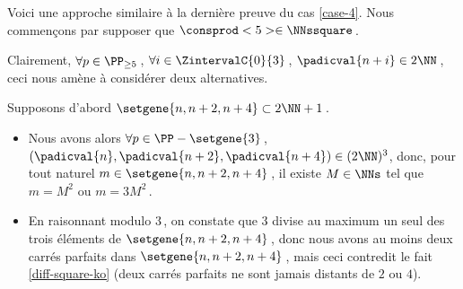 Voici une approche similaire à la dernière preuve du cas \ref{case-4}.
Nous commençons par supposer que $\consprod<5> \in \NNssquare$\,.
    
\smallskip

Clairement, $\forall p \in \PP_{\geq 5}$\,, 
$\forall i \in \ZintervalC{0}{3}$\,, 
$\padicval{n + i} \in 2 \NN$\,,
ceci nous amène à considérer deux alternatives.

\medskip

Supposons d'abord $\setgene{n, n + 2, n + 4} \subset 2 \NN + 1$\,.
%	
\begin{itemize}
	\item
	Nous avons alors
	$\forall p \in \PP - \setgene{3}$\,, 
	$(\padicval{n}, \padicval{n+2}, \padicval{n+4}) \in ( 2 \NN )^3$,
	donc, pour tout naturel $m \in \setgene{n, n + 2, n + 4}$\,, 
	il existe $M \in \NNs$ tel que 
	$m = M^2$ ou $m = 3 M^2$\,.
	
	\item En raisonnant modulo $3$\,, on constate que $3$ divise au maximum un seul des trois éléments de $\setgene{n, n + 2, n + 4}$\,, donc nous avons au moins deux carrés parfaits dans $\setgene{n, n + 2, n + 4}$\,, mais ceci contredit le fait \ref{diff-square-ko} (deux carrés parfaits ne sont jamais distants de $2$ ou $4$).
\end{itemize}

\medskip

